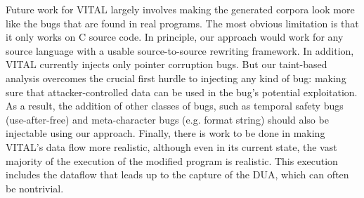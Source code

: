 
Future work for VITAL largely involves making the generated corpora look more like the bugs that are found in real programs. The most obvious limitation is that it only works on C source code. In principle, our approach would work for any source language with a usable source-to-source rewriting framework. In addition, VITAL currently injects only pointer corruption bugs. But our taint-based analysis overcomes the crucial first hurdle to injecting any kind of bug: making sure that attacker-controlled data can be used in the bug's potential exploitation. As a result, the addition of other classes of bugs, such as temporal safety bugs (use-after-free) and meta-character bugs (e.g. format string) should also be injectable using our approach. Finally, there is work to be done in making VITAL's data flow more realistic, although even in its current state, the vast majority of the execution of the modified program is realistic. This execution includes the dataflow that leads up to the capture of the DUA, which can often be nontrivial.
